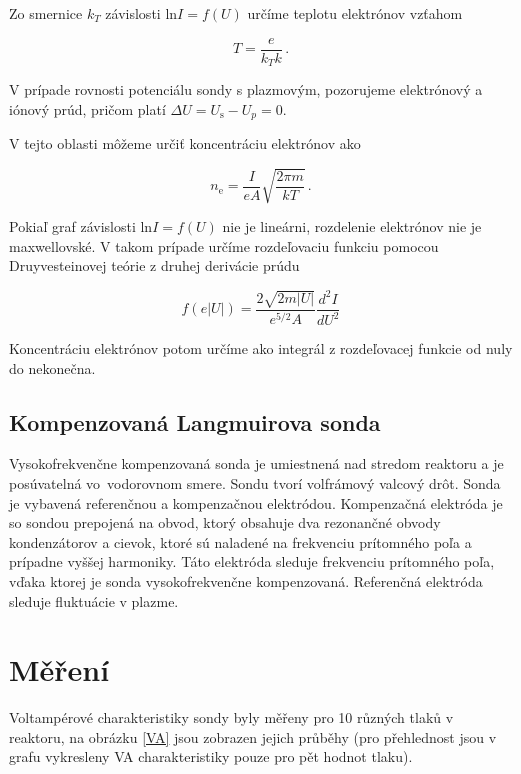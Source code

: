 \documentclass[12pt]{article}
\begin{document}
Zo smernice $k_T$ závislosti $\mathrm{ln} I = f(U)$ určíme teplotu elektrónov vzťahom

\begin{equation}
T = \frac{e}{k_T k} \, \mathrm{.}
\end{equation}

V prípade rovnosti potenciálu sondy s plazmovým, pozorujeme elektrónový a iónový prúd, pričom platí $\Delta U = U_\mathrm{s} - U_p = 0$.

V tejto oblasti môžeme určiť koncentráciu elektrónov ako

\begin{equation}
n_\mathrm{e} = \frac{I}{eA}\sqrt{\frac{2 \pi m}{k T}} \, \mathrm{.}
\end{equation}

Pokiaľ graf závislosti $\mathrm{ln} I = f(U)$ nie je lineárni, rozdelenie elektrónov nie je maxwellovské. V takom prípade určíme rozdeľovaciu funkciu pomocou Druyvesteinovej teórie z druhej derivácie prúdu

\begin{equation}
f(e|U|)= \frac{2 \sqrt{2 m |U|}}{e^{5/2} A} \frac{d^2 I}{dU^2}
\end{equation}

Koncentráciu elektrónov potom určíme ako integrál z rozdeľovacej funkcie od nuly do nekonečna.

\subsection{Kompenzovaná Langmuirova sonda}

Vysokofrekvenčne kompenzovaná sonda je umiestnená nad stredom reaktoru a je posúvatelná vo~vodorovnom smere. Sondu tvorí volfrámový valcový drôt. Sonda je vybavená referenčnou a kompenzačnou elektródou. Kompenzačná elektróda je so sondou prepojená na obvod, ktorý obsahuje dva rezonančné obvody kondenzátorov a cievok, ktoré sú naladené na frekvenciu prítomného poľa a prípadne vyššej harmoniky. Táto elektróda sleduje frekvenciu prítomného poľa, vďaka ktorej je sonda vysokofrekvenčne kompenzovaná. Referenčná elektróda sleduje fluktuácie v plazme.

\section{Měření}
Voltampérové charakteristiky sondy byly měřeny pro 10 různých tlaků v reaktoru, na obrázku \ref{VA} jsou zobrazen jejich průběhy (pro přehlednost jsou v grafu vykresleny VA charakteristiky pouze pro pět hodnot tlaku).
\end{document}
